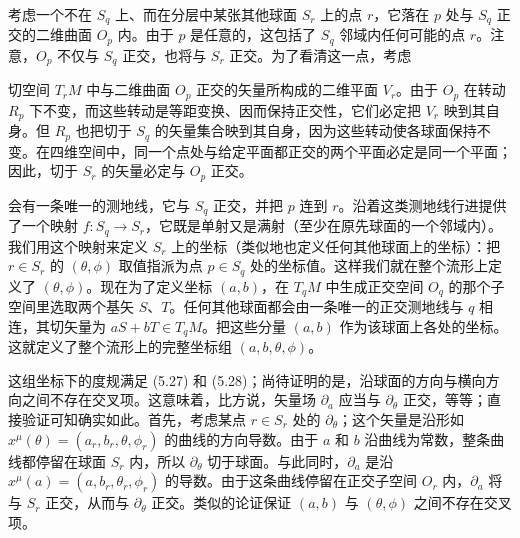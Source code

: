 考虑一个不在 $S_q$ 上、而在分层中某张其他球面 $S_r$ 上的点 $r$，它落在 $p$ 处与 $S_q$ 正交的二维曲面 $O_p$ 内。由于 $p$ 是任意的，这包括了 $S_q$ 邻域内任何可能的点 $r$。注意，$O_p$ 不仅与 $S_q$ 正交，也将与 $S_r$ 正交。为了看清这一点，考虑

切空间 $T_rM$ 中与二维曲面 $O_p$ 正交的矢量所构成的二维平面 $V_r$。由于 $O_p$ 在转动 $R_p$ 下不变，而这些转动是等距变换、因而保持正交性，它们必定把 $V_r$ 映到其自身。但 $R_p$ 也把切于 $S_q$ 的矢量集合映到其自身，因为这些转动使各球面保持不变。在四维空间中，同一个点处与给定平面都正交的两个平面必定是同一个平面；因此，切于 $S_r$ 的矢量必定与 $O_p$ 正交。

会有一条唯一的测地线，它与 $S_q$ 正交，并把 $p$ 连到 $r$。沿着这类测地线行进提供了一个映射 $f : S_q \to S_r$，它既是单射又是满射（至少在原先球面的一个邻域内）。我们用这个映射来定义 $S_r$ 上的坐标（类似地也定义任何其他球面上的坐标）：把 $r \in S_r$ 的 $(\theta, \phi)$ 取值指派为点 $p \in S_q$ 处的坐标值。这样我们就在整个流形上定义了 $(\theta, \phi)$。现在为了定义坐标 $(a, b)$，在 $T_qM$ 中生成正交空间 $O_q$ 的那个子空间里选取两个基矢 $S$、$T$。任何其他球面都会由一条唯一的正交测地线与 $q$ 相连，其切矢量为 $aS + bT \in T_qM$。把这些分量 $(a, b)$ 作为该球面上各处的坐标。这就定义了整个流形上的完整坐标组 $(a, b, \theta, \phi)$。

这组坐标下的度规满足 (5.27) 和 (5.28)；尚待证明的是，沿球面的方向与横向方向之间不存在交叉项。这意味着，比方说，矢量场 $\partial_a$ 应当与 $\partial_\theta$ 正交，等等；直接验证可知确实如此。首先，考虑某点 $r \in S_r$ 处的 $\partial_\theta$；这个矢量是沿形如 $x^\mu(\theta) = (a_r, b_r, \theta, \phi_r)$ 的曲线的方向导数。由于 $a$ 和 $b$ 沿曲线为常数，整条曲线都停留在球面 $S_r$ 内，所以 $\partial_\theta$ 切于球面。与此同时，$\partial_a$ 是沿 $x^\mu(a) = (a, b_r, \theta_r, \phi_r)$ 的导数。由于这条曲线停留在正交子空间 $O_r$ 内，$\partial_a$ 将与 $S_r$ 正交，从而与 $\partial_\theta$ 正交。类似的论证保证 $(a, b)$ 与 $(\theta, \phi)$ 之间不存在交叉项。


